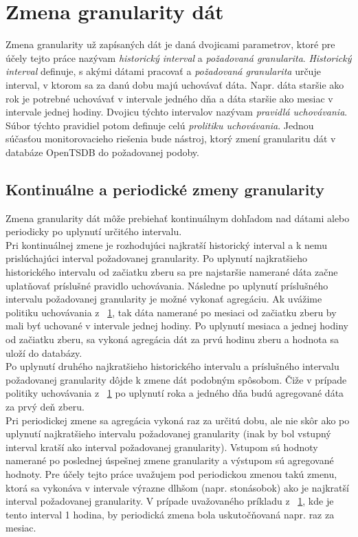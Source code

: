 \documentclass[printed,11pt,twoside,color,cover,table]{fithesis3}
\begin{document}
\section{Zmena granularity dát}
\label{sec:policy}
Zmena granularity už zapísaných dát je daná dvojicami parametrov, ktoré pre účely tejto práce nazývam
\textit{historický interval} a \textit{požadovaná granularita}. \textit{Historický interval} definuje, s akými dátami pracovať a \textit{požadovaná granularita} určuje
interval, v ktorom sa za danú dobu majú uchovávať dáta. Napr. dáta staršie ako rok je potrebné uchovávať v intervale jedného dňa a 
dáta staršie ako mesiac v intervale jednej hodiny. Dvojicu týchto intervalov nazývam \textit{pravidlá uchovávania}. Súbor týchto pravidiel potom definuje celú \textit{prolitiku uchovávania}.
Jednou súčasťou monitorovacieho riešenia bude nástroj, ktorý zmení granularitu dát v databáze OpenTSDB do požadovanej podoby.

\subsection{Kontinuálne a periodické zmeny granularity}
Zmena granularity dát môže prebiehať kontinuálnym dohľadom nad dátami alebo periodicky po uplynutí určitého intervalu. 
\\Pri kontinuálnej zmene je rozhodujúci najkratší historický interval a k nemu prislúchajúci interval požadovanej granularity. Po uplynutí najkratšieho historického intervalu od začiatku zberu sa pre 
najstaršie namerané dáta začne uplatňovať príslušné pravidlo uchovávania. Následne po uplynutí príslušného intervalu požadovanej granularity je možné vykonať agregáciu. 
Ak uvážime politiku uchovávania z ~\ref{sec:policy}, tak dáta namerané po mesiaci od začiatku zberu by mali byť uchované v intervale jednej hodiny. Po uplynutí mesiaca a jednej hodiny od začiatku zberu,
sa vykoná agregácia dát za prvú hodinu zberu a hodnota sa uloží do databázy.
\\Po uplynutí druhého najkratšieho historického intervalu a príslušného intervalu požadovanej granularity dôjde k zmene dát podobným spôsobom. Čiže v prípade politiky uchovávania z ~\ref{sec:policy} po uplynutí
roka a jedného dňa budú agregované dáta za prvý deň zberu.
\\Pri periodickej zmene sa agregácia vykoná raz za určitú dobu, ale nie skôr ako po uplynutí najkratšieho intervalu požadovanej granularity
(inak by bol vstupný interval kratší ako interval požadovanej granularity). Vstupom sú hodnoty namerané po poslednej úspešnej zmene granularity a výstupom sú agregované hodnoty. Pre účely tejto práce
uvažujem pod periodickou zmenou takú zmenu, ktorá sa vykonáva v intervale výrazne dlhšom (napr. stonásobok) ako je najkratší interval požadovanej granularity. V prípade uvažovaného príkladu z ~\ref{sec:policy}, kde je 
tento interval 1 hodina, by periodická zmena bola uskutočňovaná napr. raz za mesiac.
\end{document}
